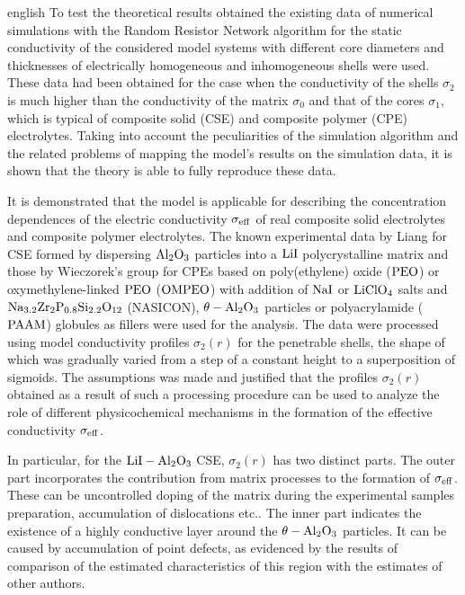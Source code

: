 \begin{otherlanguage*}{english}
To test the theoretical results obtained the existing data of numerical simulations with the Random Resistor Network algorithm for the static conductivity of the considered model systems with different core diameters and thicknesses of electrically homogeneous and inhomogeneous shells were used. These data had been obtained for the case when the conductivity of the shells $ \sigma_2 $ is much higher than the conductivity of the matrix $ \sigma_0 $ and that of the cores $ \sigma_1 $, which is typical of composite solid (CSE) and composite polymer  (CPE) electrolytes.
Taking into account the peculiarities of the simulation algorithm  and the related problems of mapping the model's results on the simulation data, it is shown that the theory is able to fully reproduce these data.

It is demonstrated that the model is applicable for describing the concentration dependences of the electric conductivity $ \sigma_ {\rm eff} $ of real  composite solid electrolytes and composite  polymer electrolytes.
The known experimental data by Liang for CSE formed by dispersing  $ \rm Al_2O_3 $ particles into a  $ \rm LiI $ polycrystalline matrix and those by Wieczorek's group for CPEs based on poly(ethylene) oxide ($ \rm PEO $) or oxymethylene-linked  $ \rm PEO $ ($ \rm OMPEO $) with addition of $ \rm NaI $ or $ \rm LiClO_4 $ salts and $ \rm Na_ {3.2} Zr_2P_ {0.8} Si_ { 2.2} O_ {12} $ (NASICON), $ \rm \theta-Al_2O_3 $ particles  or polyacrylamide ($ \rm PAAM $) globules as fillers  were used for the analysis.
The data were processed using model conductivity profiles $ \sigma_2 (r) $ for the penetrable shells, the shape of which was gradually varied from a step of a constant height to a superposition of sigmoids.
The assumptions was made and justified that the profiles $ \sigma_2 (r) $ obtained as a result of such a processing procedure can be used to analyze the role of different physicochemical mechanisms in the formation of the effective conductivity $ \sigma_ {\rm eff} $.

In particular, for the $ \rm LiI-Al_2O_3 $ CSE, $ \sigma_2 (r) $ has two  distinct parts. The outer part incorporates the contribution from matrix processes to the formation of $ \sigma _ {\rm eff} $. These can be uncontrolled doping of the matrix during the  experimental samples preparation, accumulation of dislocations etc.. The inner part indicates the existence of a highly conductive layer around the $ \rm \theta-Al_2O_3 $ particles. It can be caused by accumulation of point defects, as evidenced by the results of comparison of the estimated characteristics of this region with the estimates of other authors.


\end{otherlanguage*}
